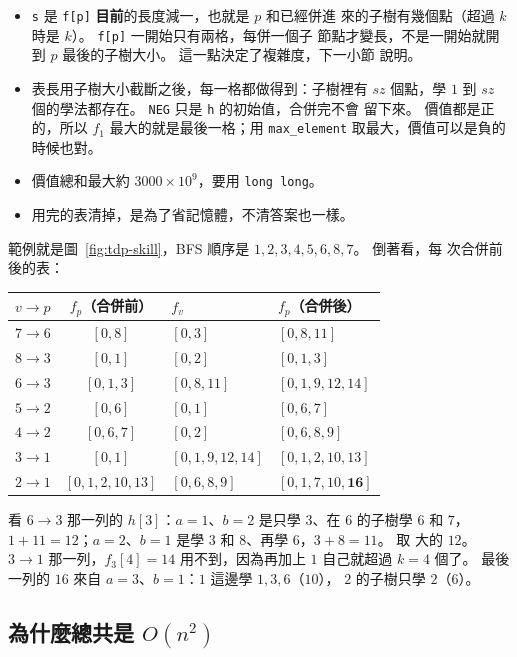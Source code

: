 \begin{itemize}
\item \texttt{s} 是 \texttt{f[p]} \textbf{目前}的長度減一，也就是 $p$ 和已經併進
來的子樹有幾個點（超過 $k$ 時是 $k$）。 \texttt{f[p]} 一開始只有兩格，每併一個子
節點才變長，不是一開始就開到 $p$ 最後的子樹大小。 這一點決定了複雜度，下一小節
說明。
\item 表長用子樹大小截斷之後，每一格都做得到：子樹裡有 $\mathit{sz}$ 個點，學 $1$
到 $\mathit{sz}$ 個的學法都存在。 \texttt{NEG} 只是 \texttt{h} 的初始值，合併完不會
留下來。 價值都是正的，所以 $f_1$ 最大的就是最後一格；用
\texttt{max\_element} 取最大，價值可以是負的時候也對。
\item 價值總和最大約 $3000 \times 10^9$，要用 \texttt{long long}。
\item 用完的表清掉，是為了省記憶體，不清答案也一樣。
\end{itemize}

範例就是圖~\ref{fig:tdp-skill}，BFS 順序是 $1, 2, 3, 4, 5, 6, 8, 7$。 倒著看，每
次合併前後的表：

\begin{center}
\begin{tabular}{ccll}
\toprule
$v \to p$ & $f_p$（合併前） & $f_v$ & $f_p$（合併後） \\
\midrule
$7 \to 6$ & $[0, 8]$ & $[0, 3]$ & $[0, 8, 11]$ \\
$8 \to 3$ & $[0, 1]$ & $[0, 2]$ & $[0, 1, 3]$ \\
$6 \to 3$ & $[0, 1, 3]$ & $[0, 8, 11]$ & $[0, 1, 9, 12, 14]$ \\
$5 \to 2$ & $[0, 6]$ & $[0, 1]$ & $[0, 6, 7]$ \\
$4 \to 2$ & $[0, 6, 7]$ & $[0, 2]$ & $[0, 6, 8, 9]$ \\
$3 \to 1$ & $[0, 1]$ & $[0, 1, 9, 12, 14]$ & $[0, 1, 2, 10, 13]$ \\
$2 \to 1$ & $[0, 1, 2, 10, 13]$ & $[0, 6, 8, 9]$ & $[0, 1, 7, 10, \mathbf{16}]$ \\
\bottomrule
\end{tabular}
\end{center}

看 $6 \to 3$ 那一列的 $h[3]$：$a = 1$、$b = 2$ 是只學 $3$、在 $6$ 的子樹學 $6$ 和
$7$，$1 + 11 = 12$；$a = 2$、$b = 1$ 是學 $3$ 和 $8$、再學 $6$，$3 + 8 = 11$。 取
大的 $12$。 $3 \to 1$ 那一列，$f_3[4] = 14$ 用不到，因為再加上 $1$ 自己就超過
$k = 4$ 個了。 最後一列的 $16$ 來自 $a = 3$、$b = 1$：$1$ 這邊學 $1, 3, 6$（$10$），
$2$ 的子樹只學 $2$（$6$）。

\subsection{為什麼總共是 $O(n^2)$}

